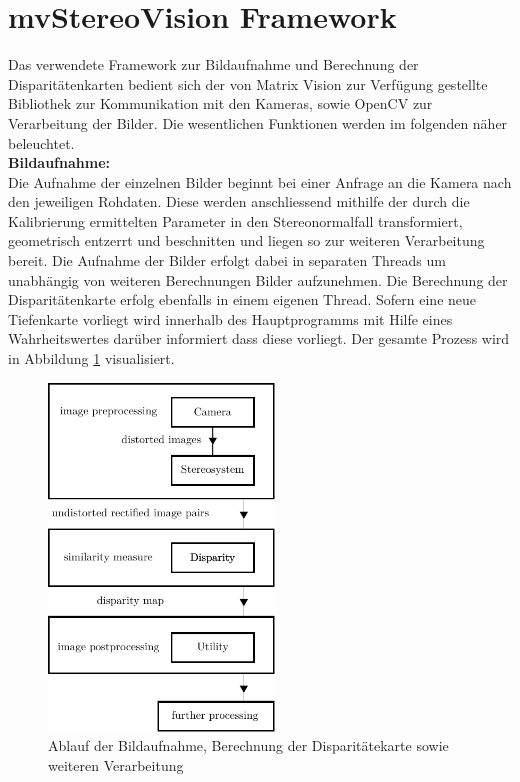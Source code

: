 \section{mvStereoVision Framework}
\label{sec:framework}
Das verwendete Framework zur Bildaufnahme und Berechnung der Disparitätenkarten bedient sich der von Matrix Vision zur Verfügung gestellte Bibliothek \cite{matrixvision} zur Kommunikation mit den Kameras, sowie OpenCV \cite{opencv} zur Verarbeitung der Bilder. Die wesentlichen Funktionen werden im folgenden näher beleuchtet.\\

\noindent
\textbf{Bildaufnahme:}\\
Die Aufnahme der einzelnen Bilder beginnt bei einer Anfrage an die Kamera nach den jeweiligen Rohdaten. Diese werden anschliessend mithilfe der durch die Kalibrierung ermittelten Parameter in den Stereonormalfall transformiert, geometrisch entzerrt und beschnitten und liegen so zur weiteren Verarbeitung bereit. Die Aufnahme der Bilder erfolgt dabei in separaten Threads um unabhängig von weiteren Berechnungen Bilder aufzunehmen. Die Berechnung der Disparitätenkarte erfolg ebenfalls in einem eigenen Thread. Sofern eine neue Tiefenkarte vorliegt wird innerhalb des Hauptprogramms mit Hilfe eines Wahrheitswertes darüber informiert dass diese vorliegt. Der gesamte Prozess wird in Abbildung \ref{fig:framework_pipeline} visualisiert.\\


\begin{figure}[h]
	\begin{center}
		\includegraphics[width=6cm]{img/framework_pipeline.pdf}
	\end{center}
	\caption{Ablauf der Bildaufnahme, Berechnung der Disparitätekarte sowie weiteren Verarbeitung}
	\label{fig:framework_pipeline}
\end{figure}



